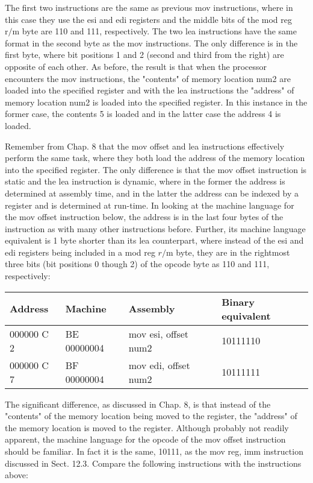 \documentclass[10pt]{article}
\begin{document}
The first two instructions are the same as previous mov instructions, where in this case they use the esi and edi registers and the middle bits of the mod reg $\mathrm{r} / \mathrm{m}$ byte are 110 and 111, respectively. The two lea instructions have the same format in the second byte as the mov instructions. The only difference is in the first byte, where bit positions 1 and 2 (second and third from the right) are opposite of each other. As before, the result is that when the processor encounters the mov instructions, the "contents" of memory location num2 are loaded into the specified register and with the lea instructions the "address" of memory location num2 is loaded into the specified register. In this instance in the former case, the contents 5 is loaded and in the latter case the address 4 is loaded.

Remember from Chap. 8 that the mov offset and lea instructions effectively perform the same task, where they both load the address of the memory location into the specified register. The only difference is that the mov offset instruction is static and the lea instruction is dynamic, where in the former the address is determined at assembly time, and in the latter the address can be indexed by a register and is determined at run-time. In looking at the machine language for the mov offset instruction below, the address is in the last four bytes of the instruction as with many other instructions before. Further, its machine language equivalent is 1 byte shorter than its lea counterpart, where instead of the esi and edi registers being included in a mod reg $r / \mathrm{m}$ byte, they are in the rightmost three bits (bit positions 0 though 2) of the opcode byte as 110 and 111, respectively:

\begin{center}
\begin{tabular}{|l|l|l|l|}
\hline
Address & Machine & Assembly & Binary equivalent \\
\hline
000000 C 2 & BE 00000004 & mov esi, offset num2 & 10111110 \\
\hline
000000 C 7 & BF 00000004 & mov edi, offset num2 & 10111111 \\
\hline
\end{tabular}
\end{center}

The significant difference, as discussed in Chap. 8, is that instead of the "contents" of the memory location being moved to the register, the "address" of the memory location is moved to the register. Although probably not readily apparent, the machine language for the opcode of the mov offset instruction should be familiar. In fact it is the same, 10111, as the mov reg, imm instruction discussed in Sect. 12.3. Compare the following instructions with the instructions above:
\end{document}
